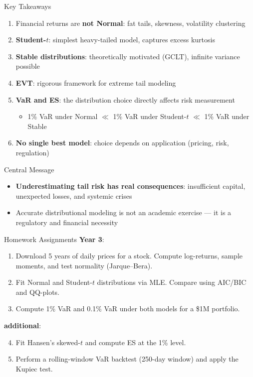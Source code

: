 \documentclass[9pt, aspectratio=169, t]{beamer}
\theoremstyle{definition}
\begin{document}
\begin{frame}{Key Takeaways}
\begin{enumerate}
\item Financial returns are \textbf{not Normal}: fat tails, skewness, volatility clustering
\item \textbf{Student-$t$}: simplest heavy-tailed model, captures excess kurtosis
\item \textbf{Stable distributions}: theoretically motivated (GCLT), infinite variance possible
\item \textbf{EVT}: rigorous framework for extreme tail modeling
\item \textbf{VaR and ES}: the distribution choice directly affects risk measurement
\begin{itemize}
\item 1\% VaR under Normal $\ll$ 1\% VaR under Student-$t$ $\ll$ 1\% VaR under Stable
\end{itemize}
\item \textbf{No single best model}: choice depends on application (pricing, risk, regulation)
\end{enumerate}

\vspace{0.2cm}
\begin{block}{Central Message}
\begin{itemize}
\item \textbf{Underestimating tail risk has real consequences}: insufficient capital, unexpected losses, and systemic crises
\item Accurate distributional modeling is not an academic exercise --- it is a regulatory and financial necessity
\end{itemize}
\end{block}
\end{frame}

\begin{frame}{Homework Assignments}
\textbf{Year 3}:
\begin{enumerate}
\item Download 5 years of daily prices for a stock. Compute log-returns, sample moments, and test normality (Jarque--Bera).
\item Fit Normal and Student-$t$ distributions via MLE. Compare using AIC/BIC and QQ-plots.
\item Compute 1\% VaR and 0.1\% VaR under both models for a \$1M portfolio.
\end{enumerate}

\vspace{0.2cm}
\textbf{additional}:
\begin{enumerate}\setcounter{enumi}{3}
\item Fit Hansen's skewed-$t$ and compute ES at the 1\% level.
\item Perform a rolling-window VaR backtest (250-day window) and apply the Kupiec test.
\end{enumerate}
\end{frame}
\end{document}
